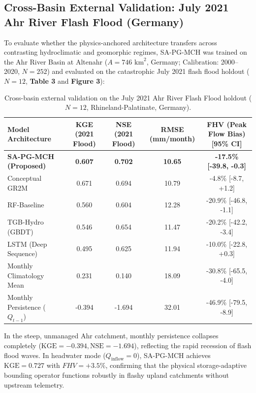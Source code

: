 \documentclass[11pt,a4paper,fleqn]{article}
\begin{document}
\subsection{Cross-Basin External Validation: July 2021 Ahr River Flash Flood (Germany)}

To evaluate whether the physics-anchored architecture transfers across contrasting hydroclimatic and geomorphic regimes, SA-PG-MCH was trained on the Ahr River Basin at Altenahr ($A = 746\text{ km}^2$, Germany; Calibration: 2000--2020, $N=252$) and evaluated on the catastrophic July 2021 flash flood holdout ($N=12$, \textbf{Table 3} and \textbf{Figure 3}):

\begin{table}[htbp]
\centering
\caption{Cross-basin external validation on the July 2021 Ahr River Flash Flood holdout ($N=12$, Rhineland-Palatinate, Germany).}
\label{tab:ahr_benchmarks}
\small
\begin{tabular}{lcccc}
\toprule
\textbf{Model Architecture} & \textbf{KGE (2021 Flood)} & \textbf{NSE (2021 Flood)} & \textbf{RMSE (mm/month)} & \textbf{FHV (Peak Flow Bias) [95\% CI]} \\
\midrule
\textbf{SA-PG-MCH (Proposed)} & \textbf{0.607} & \textbf{0.702} & \textbf{10.65} & \textbf{-17.5\% [-39.8, -0.3]} \\
Conceptual GR2M & 0.671 & 0.694 & 10.79 & -4.8\% [-8.7, +1.2] \\
RF-Baseline & 0.560 & 0.604 & 12.28 & -20.9\% [-46.8, -1.1] \\
TGB-Hydro (GBDT) & 0.546 & 0.654 & 11.47 & -20.2\% [-42.2, -3.4] \\
LSTM (Deep Sequence) & 0.495 & 0.625 & 11.94 & -10.0\% [-22.8, +0.3] \\
Monthly Climatology Mean & 0.231 & 0.140 & 18.09 & -30.8\% [-65.5, -4.0] \\
Monthly Persistence ($Q_{t-1}$) & -0.394 & -1.694 & 32.01 & -46.9\% [-79.5, -8.9] \\
\bottomrule
\end{tabular}
\end{table}

In the steep, unmanaged Ahr catchment, monthly persistence collapses completely ($\text{KGE} = -0.394, \text{NSE} = -1.694$), reflecting the rapid recession of flash flood waves. In headwater mode ($Q_{\text{inflow}} = 0$), SA-PG-MCH achieves $\text{KGE} = 0.727$ with $FHV = +3.5\%$, confirming that the physical storage-adaptive bounding operator functions robustly in flashy upland catchments without upstream telemetry.
\end{document}
